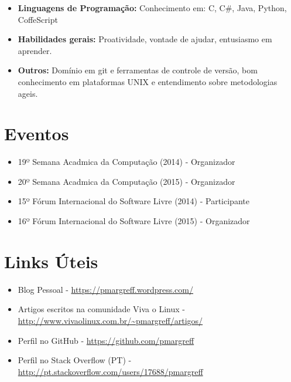 \documentclass[11pt,a4paper,sans]{moderncv}        %
\begin{document}
\vspace{6pt}

\begin{itemize}

\item \textbf{Linguagens de Programação:} Conhecimento em: C, C\#, Java, Python, CoffeScript \vspace{6pt}

\item \textbf{Habilidades gerais:} Proatividade, vontade de ajudar, entusiasmo em aprender.

\vspace{6pt}

\item \textbf{Outros:} Domínio em git e ferramentas de controle de versão, bom conhecimento em plataformas UNIX e entendimento sobre metodologias ageis.

\end{itemize}


\section{Eventos}

\vspace{6pt}
 
\begin{itemize}

\item{19º Semana Acadmica da Computação (2014) - Organizador}
\item{20º Semana Acadmica da Computação (2015)  - Organizador}
\item{15º Fórum Internacional do Software Livre (2014) - Participante}
\item{16º Fórum Internacional do Software Livre (2015) - Organizador}

\end{itemize}

\section{Links Úteis}

\vspace{6pt}
 
\begin{itemize}

\item{Blog Pessoal - \href{https://pmargreff.wordpress.com/}{https://pmargreff.wordpress.com/}}

\item{Artigos escritos na comunidade Viva o Linux  - \href{http://www.vivaolinux.com.br/~pmargreff/artigos/}{http://www.vivaolinux.com.br/\~{}pmargreff/artigos/}}

\item{Perfil no GitHub - \href{https://github.com/pmargreff}{https://github.com/pmargreff}}

\item{Perfil no Stack Overflow (PT) - \href{http://pt.stackoverflow.com/users/17688/pmargreff}{http://pt.stackoverflow.com/users/17688/pmargreff}}

\end{itemize}
\end{document}
